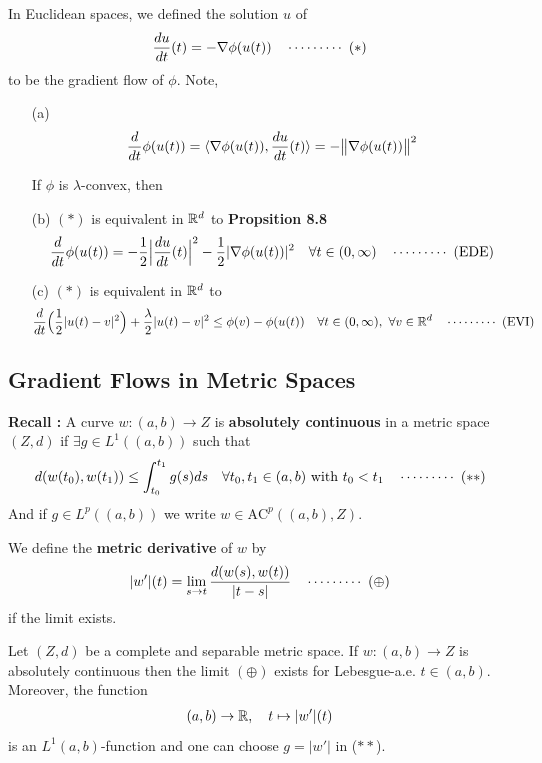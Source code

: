 \documentclass[12pt,a4paper]{article}
\begin{document}
In Euclidean spaces, we defined the solution $u$ of
\begin{align*}
\frac{du}{dt}(t) = -\nabla \phi(u(t)) \quad \cdots\cdots\cdots\,\,(*)
\end{align*}
to be the gradient flow of $\phi$. Note,
\begin{itemize}
\item[(a)]
\begin{align*}
\frac{d}{dt} \phi(u(t)) = \langle \nabla \phi(u(t)), \frac{du}{dt}(t) \rangle = -\bigl\lVert\nabla \phi(u(t))\bigr\rVert_{}^2
\end{align*}

If $\phi$ is $\lambda$-convex, then
\item[(b)] $(*)$ is equivalent in $\mathbb{R}^d$ to \textbf{Propsition 8.8}
\begin{align*}
\frac{d}{dt} \phi(u(t)) = -\frac{1}{2} \Big|\frac{du}{dt}(t)\Big|^2 - \frac{1}{2} |\nabla \phi(u(t))|^2 \quad \forall t\in (0, \infty) \quad \cdots\cdots\cdots\,\,(\text{EDE})
\end{align*}
\item[(c)] $(*)$ is equivalent in $\mathbb{R}^d$ to
\begin{align*}
\frac{d}{dt} \Big( \frac{1}{2} |u(t) - v|^2 \Big) + \frac{\lambda}{2} |u(t) - v|^2 \leq \phi(v) - \phi(u(t)) \quad \forall t\in (0, \infty), \,\, \forall v\in \mathbb{R}^d \quad \cdots\cdots\cdots\,\,(\text{EVI})
\end{align*}
\end{itemize}
\s

\subsection{Gradient Flows in Metric Spaces}

\textbf{Recall :} A curve $w: (a,b) \rightarrow Z$ is \textbf{absolutely continuous} in a metric space $(Z,d)$ if $\exists g \in L^1((a,b))$ such that
\begin{align*}
d(w(t_0), w(t_1)) \leq \int_{t_0}^{t_1} g(s) ds \quad \forall t_0, t_1 \in (a,b) \text{ with }t_0<t_1 \quad \cdots\cdots\cdots\,\,(**)
\end{align*}
And if $g\in L^p((a,b))$ we write $w\in \text{AC}^p((a,b), Z)$.
\s

 We define the \textbf{metric derivative} of $w$ by
\begin{align*}
|w'|(t) = \lim_{s\rightarrow t} \frac{d(w(s), w(t))}{|t-s|} \quad \cdots\cdots\cdots\,\,(\oplus)
\end{align*}
if the limit exists.
\s

 Let $(Z,d)$ be a complete and separable metric space. If $w: (a,b) \rightarrow Z$ is absolutely continuous then the limit $(\oplus)$ exists for Lebesgue-a.e. $t\in (a,b)$. Moreover, the function
\begin{align*}
(a,b) \rightarrow \mathbb{R}, \quad t\mapsto |w'|(t)
\end{align*}
is an $L^1(a,b)$-function and one can choose $g=|w'|$ in ($**$).
\end{document}
